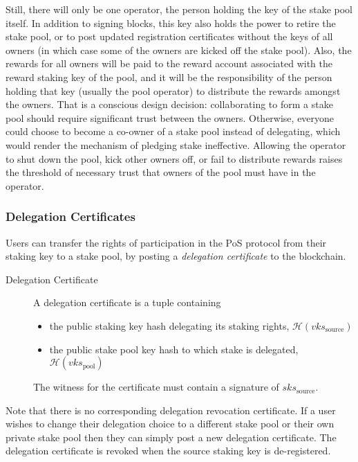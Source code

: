 \documentclass[11pt,a4paper]{article}
\begin{document}
Still, there will only be one operator, the person holding the key of the stake
pool itself. In addition to signing blocks, this key also holds the power to
retire the stake pool, or to post updated registration certificates without the
keys of all owners (in which case some of the owners are kicked off the stake
pool). Also, the rewards for all owners will be paid to the reward account
associated with the reward staking key of the pool, and it will be the
responsibility of the person holding that key (usually the pool operator) to
distribute the rewards amongst the owners.
That is a conscious design decision: collaborating to form a stake pool should
require significant trust between the owners. Otherwise, everyone could choose
to become a co-owner of a stake pool instead of delegating, which would render
the mechanism of pledging stake ineffective. Allowing the operator to shut down
the pool, kick other owners off, or fail to distribute rewards raises the
threshold of necessary trust that owners of the pool must have in the operator.

\subsubsection{Delegation Certificates}
\label{delegation-certificates}

Users can transfer the rights of participation in the PoS protocol from
their staking key to a stake pool, by posting a \emph{delegation
certificate} to the blockchain.

\begin{description}
\item[Delegation Certificate]
A delegation certificate is a tuple containing

\begin{itemize}
\item
  the public staking key hash delegating its staking rights,
  \(\mathcal{H}(vks_\text{source})\)
\item
  the public stake pool key hash to which stake is delegated,
  \(\mathcal{H}(vks_\text{pool})\)
\end{itemize}

The witness for the certificate must contain a signature of
\(sks_\text{source}\).
\end{description}

Note that there is no corresponding delegation revocation certificate.
If a user wishes to change their delegation choice to a different stake
pool or their own private stake pool then they can simply post a new
delegation certificate. The delegation certificate is revoked when the
source staking key is de-registered.
\end{document}
